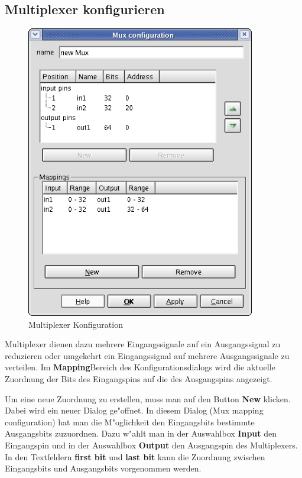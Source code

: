 \documentclass[a4paper,titlepage,12pt,ngerman]{scrbook}
\begin{document}
\subsection{Multiplexer konfigurieren}
\begin{figure}[htbp]

\begin{center}

\includegraphics[width=10cm]{MuxConfiguration}

\caption{Multiplexer Konfiguration}\label{test}

\end{center}

\end{figure}

Multiplexer dienen dazu mehrere Eingangssignale auf ein Ausgangssignal zu reduzieren oder umgekehrt ein  Eingangssignal auf mehrere Ausgangssignale zu verteilen.
Im {\bf Mapping}Bereich des Konfigurationsdialogs wird die aktuelle Zuordnung der Bits des Eingangspins auf die des Ausgangspins angezeigt.\par
Um eine neue Zuordnung zu erstellen, muss man auf den Button {\bf New} klicken. Dabei wird ein neuer Dialog ge"offnet. In diesem Dialog (Mux mapping configuration) hat man die M"oglichkeit den Eingangsbits bestimmte Ausgangsbits zuzuordnen. Dazu w"ahlt man in der Auswahlbox {\bf Input} den Eingangspin und in der Auswahlbox {\bf Output} den Ausgangspin des Multiplexers. In den Textfeldern {\bf first bit} und {\bf last bit} kann die Zuordnung zwischen Eingangsbits und Ausgangsbits vorgenommen werden.\par
\end{document}
